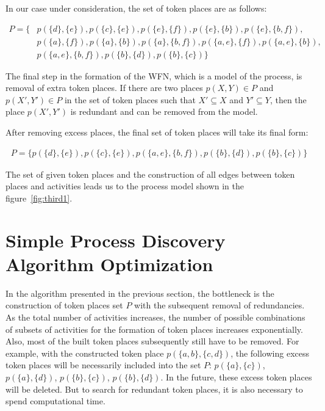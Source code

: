 \documentclass[
11pt,%
tightenlines,%
twoside,%
onecolumn,%
nofloats,%
nobibnotes,%
nofootinbib,%
superscriptaddress,%
noshowpacs,%
centertags]%
{revtex4}
\begin{document}
In our case under consideration, the set of token places are as follows:

\begin{equation}\label{eqn:p1}
\begin{aligned}
P = \{
& p(\{d\}, \{e\}),
p(\{c\}, \{e\}),
p(\{e\}, \{f\}),
p(\{e\}, \{b\}),
p(\{e\}, \{b, f\}), \\
& p(\{a\}, \{f\}),
p(\{a\}, \{b\}),
p(\{a\}, \{b, f\}),
p(\{a, e\}, \{f\}),
p(\{a, e\}, \{b\}), \\
& p(\{a, e\}, \{b, f\}),
p(\{b\}, \{d\}),
p(\{b\}, \{c\})
\}
\end{aligned}
\end{equation}

The final step in the formation of the WFN, which is a model of the process, is removal of extra token places.
If there are two places $p(X, Y) \in P$ and $p(X ', Y') \in P$ in the set of token places such that $X' \subseteq X$ and $Y' \subseteq Y$, then the place $p(X', Y')$ is redundant and can be removed from the model.

After removing excess places, the final set of token places will take its final form:

\begin{equation}\label{eqn:p2}
\begin{aligned}
P = \{
p(\{d\}, \{e\}), p(\{c\}, \{e\}), p(\{a, e\}, \{b, f\}), p(\{b\}, \{d\}), p(\{b\}, \{c\})
\}
\end{aligned}
\end{equation}

The set of given token places and the construction of all edges between token places and activities leads us to the process model shown in the figure~\ref{fig:third1}.

\section{Simple Process Discovery Algorithm Optimization}

In the algorithm presented in the previous section, the bottleneck is the construction of token places set $P$ with the subsequent removal of redundancies.
As the total number of activities increases, the number of possible combinations of subsets of activities for the formation of token places increases exponentially.
Also, most of the built token places subsequently still have to be removed.
For example, with the constructed token place $p(\{a, b\}, \{c, d\})$, the following excess token places will be necessarily included into the set $P$: $p(\{a\}, \{c\})$, $p(\{a\}, \{d\})$, $p(\{b\}, \{c\})$, $p(\{b\}, \{d\})$.
In the future, these excess token places will be deleted.
But to search for redundant token places, it is also necessary to spend computational time.
\end{document}
